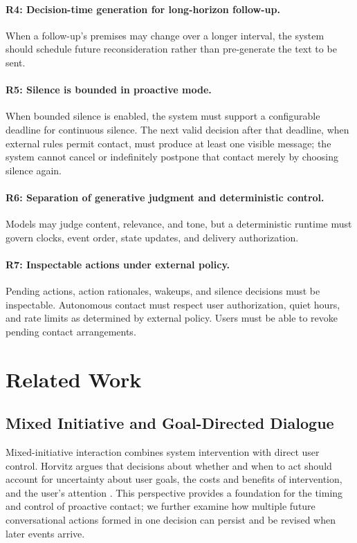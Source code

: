 \documentclass[manuscript,nonacm]{acmart}
\begin{document}
\paragraph{R4: Decision-time generation for long-horizon follow-up.}
When a follow-up's premises may change over a longer interval, the system should
schedule future reconsideration rather than pre-generate the text to be sent.

\paragraph{R5: Silence is bounded in proactive mode.}
When bounded silence is enabled, the system must support a configurable deadline
for continuous silence. The next valid decision after that deadline, when external
rules permit contact, must
produce at least one visible message; the system cannot cancel or indefinitely
postpone that contact merely by choosing silence again.

\paragraph{R6: Separation of generative judgment and deterministic control.}
Models may judge content, relevance, and tone, but a deterministic runtime must
govern clocks, event order, state updates, and delivery authorization.

\paragraph{R7: Inspectable actions under external policy.}
Pending actions, action rationales, wakeups, and silence decisions must be
inspectable. Autonomous contact must respect user authorization, quiet hours,
and rate limits as determined by external policy. Users must be able to revoke
pending contact arrangements.

\section{Related Work}

\subsection{Mixed Initiative and Goal-Directed Dialogue}

Mixed-initiative interaction combines system intervention with direct user
control. Horvitz argues that decisions about whether and when to act should
account for uncertainty about user goals, the costs and benefits of intervention,
and the user's attention \cite{horvitz1999mixed}. This perspective provides a
foundation for the timing and control of proactive contact; we further examine
how multiple future conversational actions formed in one decision can persist
and be revised when later events arrive.
\end{document}
